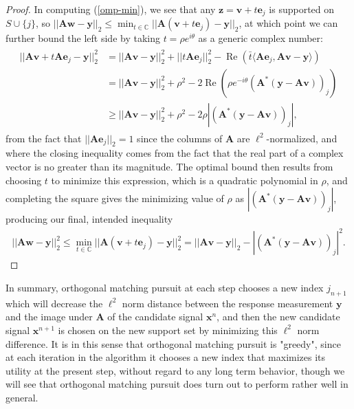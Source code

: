 \documentclass[12pt,a4paper]{amsart}
\numberwithin{equation}{section}
\theoremstyle{plain}
\theoremstyle{definition}
\newcommand{\BC}{\mathbb C}
\newcommand{\bdy}{\mathbf{y}}
\newcommand{\bdx}{\mathbf{x}}
\newcommand{\bdz}{\mathbf{z}}
\newcommand{\bdv}{\mathbf{v}}
\newcommand{\bdw}{\mathbf{w}}
\newcommand{\bde}{\mathbf{e}}
\newcommand{\bdA}{\mathbf{A}}
\DeclareMathOperator{\Rea}{Re}
\begin{document}
\begin{proof}
    In computing (\ref{omp-min}), we see that any $\bdz=\bdv+t\bde_j$ is supported on $S\cup\{j\}$, so $||\bdA\bdw-\bdy||_2\leq\min_{t\in\BC}||\bdA(\bdv+t\bde_j)-\bdy||_2$, at which point we can further bound the left side by taking $t=\rho e^{i\theta}$ as a generic complex number:
    \begin{align*}
    \begin{split}
        ||\bdA\bdv+t\bdA\bde_j-\bdy||^2_2&=||\bdA\bdv-\bdy||^2_2+||t\bdA\bde_j||^2_2-\Rea(\bar t\langle\bdA\bde_j,\bdA\bdv-\bdy\rangle)\\&=||\bdA\bdv-\bdy||_2^2+\rho^2-2\Rea(\rho e^{-i\theta}(\bdA^*(\bdy-\bdA\bdv))_j)\\&\geq||\bdA\bdv-\bdy||_2^2+\rho^2-2\rho|(\bdA^*(\bdy-\bdA\bdv))_j|,
    \end{split}
    \end{align*}
    from the fact that $||\bdA\bde_j||_2=1$ since the columns of $\bdA$ are $\ell^2$-normalized, and where the closing inequality comes from the fact that the real part of a complex vector is no greater than its magnitude. The optimal bound then results from choosing $t$ to minimize this expression, which is a quadratic polynomial in $\rho$, and completing the square gives the minimizing value of $\rho$ as $|(\bdA^*(\bdy-\bdA\bdv))_j|$, producing our final, intended inequality
    \begin{align*}
        ||\bdA\bdw-\bdy||^2_2\leq\min_{t\in\BC}||\bdA(\bdv+t\bde_j)-\bdy||^2_2=||\bdA\bdv-\bdy||_2-|(\bdA^*(\bdy-\bdA\bdv))_j|^2.
    \end{align*}
\end{proof}

In summary, orthogonal matching pursuit at each step chooses a new index $j_{n+1}$ which will decrease the $\ell^2$ norm distance between the response measurement $\bdy$ and the image under $\bdA$ of the candidate signal $\bdx^n$, and then the new candidate signal $\bdx^{n+1}$ is chosen on the new support set by minimizing this $\ell^2$ norm difference. It is in this sense that orthogonal matching pursuit is "greedy", since at each iteration in the algorithm it chooses a new index that maximizes its utility at the present step, without regard to any long term behavior, though we will see that orthogonal matching pursuit does turn out to perform rather well in general.
\end{document}
